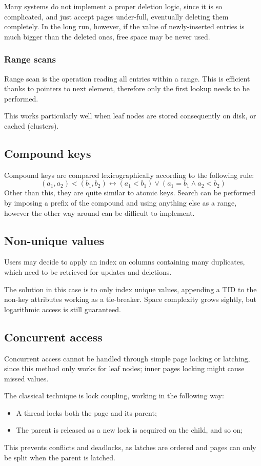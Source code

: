 Many systems do not implement a proper deletion logic, since it is so complicated, and just accept pages under-full, eventually deleting them completely. In the long run, however, if the value of newly-inserted entries is much bigger than the deleted ones, free space may be never used.

\subsubsection{Range scans}
Range scan is the operation reading all entries within a range. This is efficient thanks to pointers to next element, therefore only the first lookup needs to be performed.

This works particularly well when leaf nodes are stored consequently on disk, or cached (clusters).

\subsection{Compound keys}
Compound keys are compared lexicographically according to the following rule:
$$(a_1, a_2) < (b_1, b_2) \leftrightarrow (a_1 < b_1) \lor (a_1 = b_1 \land a_2 < b_2)$$
Other than this, they are quite similar to atomic keys. Search can be performed by imposing a prefix of the compound and using anything else as a range, however the other way around can be difficult to implement.

\subsection{Non-unique values}
Users may decide to apply an index on columns containing many duplicates, which need to be retrieved for updates and deletions. 

The solution in this case is to only index unique values, appending a TID to the non-key attributes working as a tie-breaker. Space complexity grows sightly, but logarithmic access is still guaranteed. 

\subsection{Concurrent access}
Concurrent access cannot be handled through simple page locking or latching, since this method only works for leaf nodes; inner pages locking might cause missed values.

The classical technique is lock coupling, working in the following way:
\begin{itemize}
	\item A thread locks both the page and its parent;
	\item The parent is released as a new lock is acquired on the child, and so on;
\end{itemize}
This prevents conflicts and deadlocks, as latches are ordered and pages can only be split when the parent is latched.

